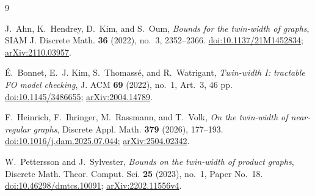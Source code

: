 \documentclass[11pt]{amsart}
\theoremstyle{remark}
\begin{document}
\begin{thebibliography}{9}

J.~Ahn, K.~Hendrey, D.~Kim, and S.~Oum,
\emph{Bounds for the twin-width of graphs},
SIAM J. Discrete Math. \textbf{36} (2022), no.~3, 2352--2366.
\href{https://doi.org/10.1137/21M1452834}{doi:10.1137/21M1452834};
\href{https://arxiv.org/abs/2110.03957}{arXiv:2110.03957}.

\'E.~Bonnet, E.~J. Kim, S.~Thomass\'e, and R.~Watrigant,
\emph{Twin-width I: tractable FO model checking},
J. ACM \textbf{69} (2022), no.~1, Art.~3, 46 pp.
\href{https://doi.org/10.1145/3486655}{doi:10.1145/3486655};
\href{https://arxiv.org/abs/2004.14789}{arXiv:2004.14789}.

F.~Heinrich, F.~Ihringer, M.~Rassmann, and T.~Volk,
\emph{On the twin-width of near-regular graphs},
Discrete Appl. Math. \textbf{379} (2026), 177--193.
\href{https://doi.org/10.1016/j.dam.2025.07.044}{doi:10.1016/j.dam.2025.07.044};
\href{https://arxiv.org/abs/2504.02342}{arXiv:2504.02342}.

W.~Pettersson and J.~Sylvester,
\emph{Bounds on the twin-width of product graphs},
Discrete Math. Theor. Comput. Sci. \textbf{25} (2023), no.~1, Paper No.~18.
\href{https://doi.org/10.46298/dmtcs.10091}{doi:10.46298/dmtcs.10091};
\href{https://arxiv.org/abs/2202.11556}{arXiv:2202.11556v4}.

\end{thebibliography}
\end{document}
